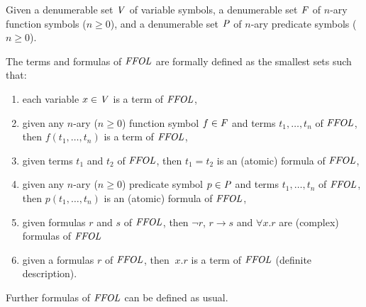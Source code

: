 \begin{definition}
  Given a denumerable set $\V$ of variable symbols, a denumerable set
  $\F$ of $n$-ary function symbols ($n\geq 0$), and a denumerable set
  $\P$ of $n$-ary predicate symbols ($n\geq 0$).

  The terms and formulas of $\FFOL$ are formally defined as the
  smallest sets such that:
\begin{enumerate}
\item each variable $x\in\V$ is a term of $\FFOL$, 
\item given any $n$-ary ($n\geq 0$) function symbol $f\in\F$ and terms
  $t_1,\ldots,t_n$ of $\FFOL$, then $f(t_1,\ldots,t_n)$ is a term of $\FFOL$, 
\item given terms $t_1$ and $t_2$ of $\FFOL$, then $t_1 = t_2$ is an
  (atomic) formula of $\FFOL$,
\item given any $n$-ary ($n\geq 0$) predicate symbol $p\in\P$ and terms
$t_1,\ldots,t_n$ of $\FFOL$, then $p(t_1,\ldots,t_n)$ is an (atomic)
formula of $\FFOL$, 
\item given formulas $r$ and $s$ of $\FFOL$, then $\neg r$, $r
  \rightarrow s$ and $\forall x. r$ are (complex) formulas of $\FFOL$
\item given a formulas $r$ of $\FFOL$, then $\ x. r$ is a
  term of $\FFOL$ (definite  description).
\end{enumerate}
\end{definition}

Further formulas of $\FFOL$  can be defined as usual.

